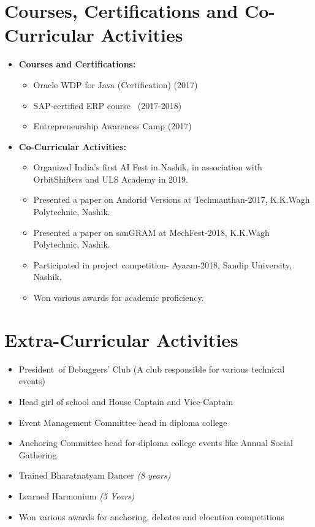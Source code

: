 \documentclass[a4,11pt]{article}
\newcommand{\resumeSubHeadingListStart}{\begin{itemize}[leftmargin=*]}
\newcommand{\resumeSubHeadingListEnd}{\end{itemize}}
\begin{document}
\section{Courses, Certifications and Co-Curricular Activities}
	\resumeSubHeadingListStart
	  	\item \textbf{Courses and Certifications:}
		\begin{itemize}
			\item Oracle WDP for Java (Certification) (2017)
			\item SAP-certified ERP course  (2017-2018)
			\item Entrepreneurship Awareness Camp (2017)
		\end{itemize}
		\item \textbf{Co-Curricular Activities:}
		\begin{itemize}
			\item Organized India's first AI Fest in Nashik, in association with OrbitShifters and ULS Academy in 2019.
			\item Presented a paper on Andorid Versions at Techmanthan-2017, K.K.Wagh Polytechnic, Nashik.
			\item Presented a paper on sanGRAM at MechFest-2018, K.K.Wagh Polytechnic, Nashik.
			\item Participated in project competition- Ayaam-2018, Sandip University, Nashik.
			\item Won various awards for academic proficiency.
		\end{itemize}
	\resumeSubHeadingListEnd

\section{Extra-Curricular Activities}
	\resumeSubHeadingListStart
		\item President of Debuggers' Club (A club responsible for various technical events)
		\item Head girl of school and House Captain and Vice-Captain
		\item Event Management Committee head in diploma college
		\item Anchoring Committee head for diploma college events like Annual Social Gathering
		\item Trained Bharatnatyam Dancer \textit{(8 years)}
		\item Learned Harmonium \textit{(5 Years)}
		\item Won various awards for anchoring, debates and elocution competitions

	\resumeSubHeadingListEnd

\end{document}
